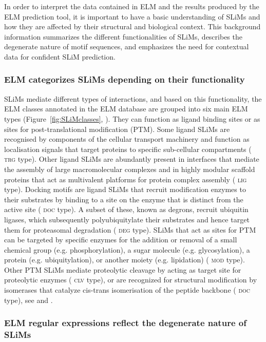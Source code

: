 \documentclass[12pt]{article}
\newcommand\motif[1]{%
    \textsc{\lowercase{#1}}%
}
\begin{document}
In order to interpret the data contained in ELM and the results produced by the
ELM prediction tool, it is important to have a basic understanding of SLiMs
and how they are affected by their structural and biological context. This
background information summarizes the different functionalities of SLiMs,
describes the degenerate nature of motif sequences, and emphasizes the need for
contextual data for confident SLiM prediction.

\subsubsection*{ELM categorizes SLiMs depending on their functionality}

SLiMs mediate different types of interactions, and based on this functionality,
the ELM classes annotated in the ELM database are grouped into six main ELM
types (Figure~\ref{fig:SLiMclasses}, \cite{24214962}). They can function as ligand binding sites or
as sites for post-translational modification (PTM). Some ligand SLiMs are
recognised by components of the cellular transport machinery and function as
localisation signals that target proteins to specific sub-cellular compartments
(\motif{TRG} type). Other ligand SLiMs are abundantly present in interfaces that mediate
the assembly of large macromolecular complexes and in highly modular scaffold
proteins that act as multivalent platforms for protein complex assembly
(\motif{LIG} type). Docking motifs are ligand SLiMs that recruit modification enzymes to
their substrates by binding to a site on the enzyme that is distinct from the
active site (\motif{DOC} type). A subset of these, known as degrons, recruit ubiquitin
ligases, which subsequently polyubiquitylate their substrates and hence target
them for proteasomal degradation (\motif{DEG} type). SLiMs that act as sites for PTM can
be targeted by specific enzymes for the addition or removal of a small chemical
group (e.g. phosphorylation), a sugar molecule (e.g. glycosylation), a protein
(e.g. ubiquitylation), or another moiety (e.g. lipidation) (\motif{MOD} type). Other PTM
SLiMs mediate proteolytic cleavage by acting as target site for proteolytic
enzymes (\motif{CLV} type), or are recognized for structural modification by isomerases
that catalyze cis-trans isomerisation of the peptide backbone (\motif{DOC} type), see
\cite{24926813} and \cite{24773235}.

\subsubsection*{ELM regular expressions reflect the degenerate nature of SLiMs}
\end{document}

